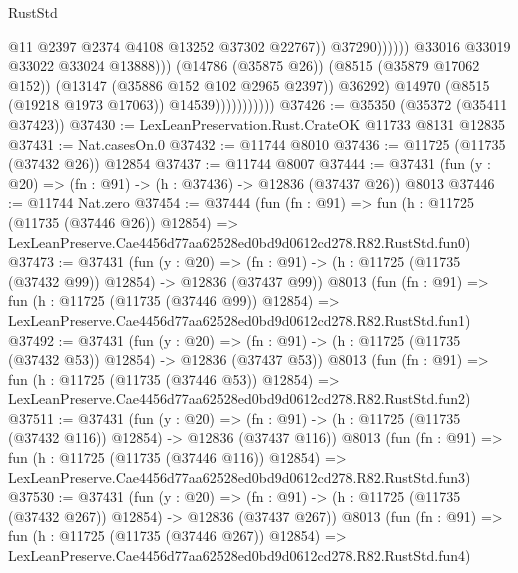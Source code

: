 \begin{lexlean}{RustStd}
\begin{coremodule}
                                                  @11
                                                  @2397
                                                  @2374
                                                  @4108
                                                  @13252
                                                  @37302
                                                  @22767))
                                              @37290))))))
                                  @33016
                                  @33019
                                  @33022
                                  @33024
                                  @13888)))
                            (@14786 (@35875 @26))
                            (@8515 (@35879 @17062 @152))
                            (@13147 (@35886 @152 @102 @2965 @2397))
                            @36292)
                          @14970
                          (@8515 (@19218 @1973 @17063))
                          @14539)))))))))))
@37426 := @35350 (@35372 (@35411 @37423))
@37430 := LexLeanPreservation.Rust.CrateOK @11733 @8131 @12835
@37431 := Nat.casesOn.{0}
@37432 := @11744 @8010
@37436 := @11725 (@11735 (@37432 @26)) @12854
@37437 := @11744 @8007
@37444 := @37431 (fun (y : @20) => (fn : @91) -> (h : @37436) -> @12836 (@37437 @26)) @8013
@37446 := @11744 Nat.zero
@37454 := @37444
    (fun (fn : @91) =>
    fun (h : @11725 (@11735 (@37446 @26)) @12854) =>
    LexLeanPreserve.Cae4456d77aa62528ed0bd9d0612cd278.R82.RustStd.fun0)
@37473 := @37431
    (fun (y : @20) =>
    (fn : @91) -> (h : @11725 (@11735 (@37432 @99)) @12854) -> @12836 (@37437 @99))
    @8013
    (fun (fn : @91) =>
    fun (h : @11725 (@11735 (@37446 @99)) @12854) =>
    LexLeanPreserve.Cae4456d77aa62528ed0bd9d0612cd278.R82.RustStd.fun1)
@37492 := @37431
    (fun (y : @20) =>
    (fn : @91) -> (h : @11725 (@11735 (@37432 @53)) @12854) -> @12836 (@37437 @53))
    @8013
    (fun (fn : @91) =>
    fun (h : @11725 (@11735 (@37446 @53)) @12854) =>
    LexLeanPreserve.Cae4456d77aa62528ed0bd9d0612cd278.R82.RustStd.fun2)
@37511 := @37431
    (fun (y : @20) =>
    (fn : @91) -> (h : @11725 (@11735 (@37432 @116)) @12854) -> @12836 (@37437 @116))
    @8013
    (fun (fn : @91) =>
    fun (h : @11725 (@11735 (@37446 @116)) @12854) =>
    LexLeanPreserve.Cae4456d77aa62528ed0bd9d0612cd278.R82.RustStd.fun3)
@37530 := @37431
    (fun (y : @20) =>
    (fn : @91) -> (h : @11725 (@11735 (@37432 @267)) @12854) -> @12836 (@37437 @267))
    @8013
    (fun (fn : @91) =>
    fun (h : @11725 (@11735 (@37446 @267)) @12854) =>
    LexLeanPreserve.Cae4456d77aa62528ed0bd9d0612cd278.R82.RustStd.fun4)

\end{coremodule}
\end{lexlean}
